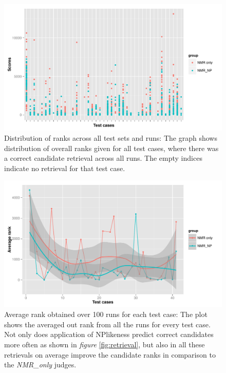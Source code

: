 \documentclass[10pt]{bmc_article}
\newenvironment{bmcformat}{\begin{raggedright}\baselineskip20pt\sloppy\setboolean{publ}{false}}{\end{raggedright}\baselineskip20pt\sloppy}
\begin{document}
\begin{bmcformat}
\begin{figure}[hbt]
  \label{fig:worstRank}
\end{figure}
\begin{figure}[hbt]
  \centering
  	\includegraphics[angle=0,clip=false,scale=0.5]{pics/overallScores.pdf}
	
  \caption{Distribution of ranks across all test sets and runs:  The graph shows distribution of overall ranks given for all test cases, where there was a correct candidate retrieval across all runs. The empty indices indicate no retrieval for that test case.}
   
  \label{fig:overallScores}
\end{figure}
\begin{figure}[hbt]
  \centering
  	\includegraphics[angle=0,clip=false,scale=0.5]{pics/averageRank.pdf}
	
  \caption{Average rank obtained over 100 runs for each test case: The plot shows the averaged out rank from all the runs for every test case. Not only does application of NPlikeness predict correct candidates more often as shown in \emph{figure} \ref{fig:retrieval}, but also in all these retrievals on average improve the candidate ranks in comparison to the \emph{NMR\_only} judges. 
}
   
  \label{fig:averageRank}
\end{figure}
   

   
\end{bmcformat}
\end{document}
